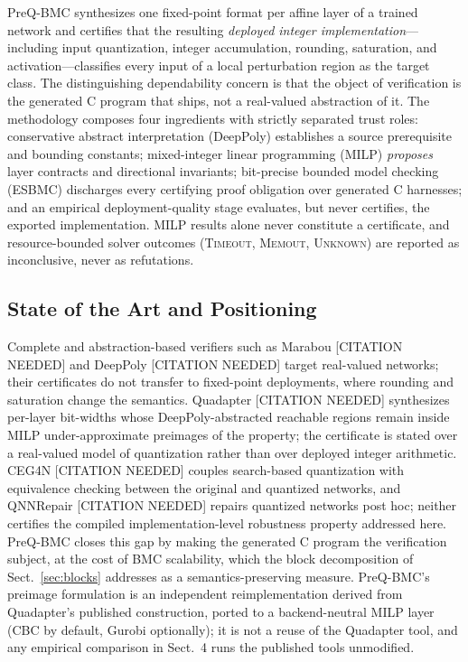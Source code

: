 PreQ-BMC synthesizes one fixed-point format per affine layer of a trained
network and certifies that the resulting \emph{deployed integer
implementation}---including input quantization, integer accumulation,
rounding, saturation, and activation---classifies every input of a local
perturbation region as the target class. The distinguishing dependability
concern is that the object of verification is the generated C program
that ships, not a real-valued abstraction of it. The methodology
composes four ingredients with strictly separated trust roles:
conservative abstract interpretation (DeepPoly) establishes a source
prerequisite and bounding constants; mixed-integer linear programming
(MILP) \emph{proposes} layer contracts and directional invariants;
bit-precise bounded model checking (ESBMC) discharges every certifying
proof obligation over generated C harnesses; and an empirical
deployment-quality stage evaluates, but never certifies, the exported
implementation. MILP results alone never constitute a certificate, and
resource-bounded solver outcomes (\textsc{Timeout}, \textsc{Memout},
\textsc{Unknown}) are reported as inconclusive, never as refutations.
 
\subsection{State of the Art and Positioning}
\label{sec:related}
 
Complete and abstraction-based verifiers such as Marabou
[CITATION NEEDED] and DeepPoly [CITATION NEEDED] target real-valued
networks; their certificates do not transfer to fixed-point
deployments, where rounding and saturation change the semantics.
Quadapter [CITATION NEEDED] synthesizes per-layer bit-widths whose
DeepPoly-abstracted reachable regions remain inside MILP
under-approximate preimages of the property; the certificate is stated
over a real-valued model of quantization rather than over deployed
integer arithmetic. CEG4N [CITATION NEEDED] couples search-based
quantization with equivalence checking between the original and
quantized networks, and QNNRepair [CITATION NEEDED] repairs quantized
networks post hoc; neither certifies the compiled implementation-level
robustness property addressed here. PreQ-BMC closes this gap by making
the generated C program the verification subject, at the cost of
BMC scalability, which the block decomposition of
Sect.~\ref{sec:blocks} addresses as a semantics-preserving measure.
PreQ-BMC's preimage formulation is an independent reimplementation
derived from Quadapter's published construction, ported to a
backend-neutral MILP layer (CBC by default, Gurobi optionally); it is
not a reuse of the Quadapter tool, and any empirical comparison in
Sect.~4 runs the published tools unmodified.
 
